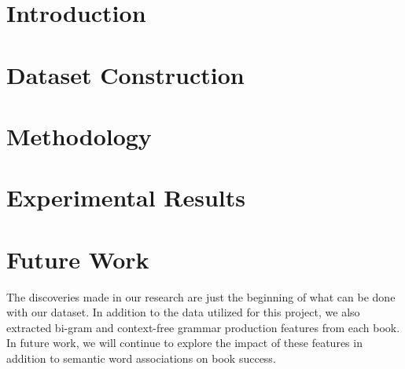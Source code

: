 







% 





\section{Introduction}\label{sec:introduction}



\section{Dataset Construction}\label{sec:dataset-construction}





\section{Methodology}\label{sec:methodology}



\section{Experimental Results}\label{sec:experimental-results}




\section{Future Work}\label{sec:future work}

The discoveries made in our research are just the beginning of what can be done with our dataset.
In addition to the data utilized for this project, we also extracted bi-gram and context-free grammar production features from each book.
In future work, we will continue to explore the impact of these features in addition to semantic word associations on book success.

